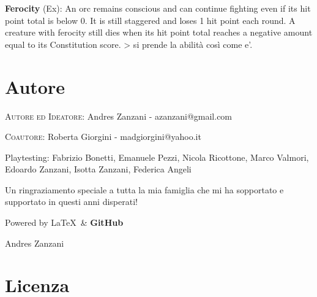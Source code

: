 \documentclass[a4paper,11pt,twoside,openany]{book}
\begin{document}
\textbf{Ferocity} (Ex): An orc remains conscious and can continue fighting even if its hit point total is below 0. It is still staggered and loses 1 hit point each round. A creature with ferocity still dies when its hit point total reaches a negative amount equal to its Constitution score. \textgreater{} si prende la abilità così come e'.

\pagebreak

%



\pagebreak

\section{Autore}

\bigskip

\textsc{Autore ed Ideatore}: Andres Zanzani  - azanzani@gmail.com

\bigskip
\textsc{Coautore}: Roberta Giorgini - madgiorgini@yahoo.it

\bigskip

Playtesting: Fabrizio Bonetti, Emanuele Pezzi, Nicola Ricottone, Marco Valmori, Edoardo Zanzani, Isotta Zanzani, Federica Angeli

\bigskip

Un ringraziamento speciale a tutta la mia famiglia che mi ha sopportato e supportato in questi anni disperati!

\bigskip

Powered by \Large\LaTeX\ \normalfont\& \Large\textbf{GitHub}

\bigskip

Andres Zanzani

\pagebreak

\section{Licenza} 
\end{document}
